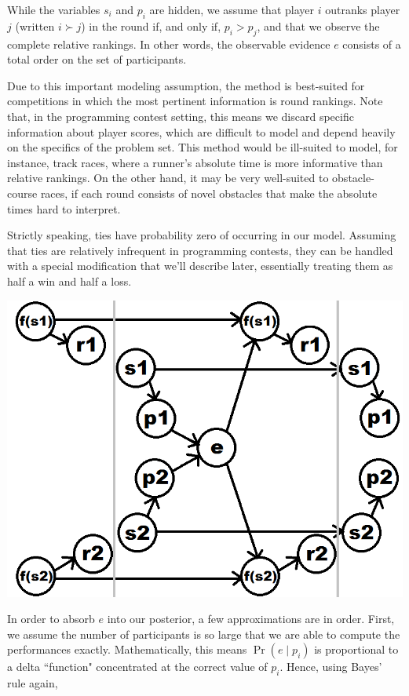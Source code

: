 While the variables $s_i$ and $p_i$ are hidden, we assume that player $i$ outranks player $j$ (written $i \succ j$) in the round if, and only if, $p_i > p_j$, and that we observe the complete relative rankings. In other words, the observable evidence $e$ consists of a total order on the set of participants.

Due to this important modeling assumption, the method is best-suited for competitions in which the most pertinent information is round rankings. Note that, in the programming contest setting, this means we discard specific information about player scores, which are difficult to model and depend heavily on the specifics of the problem set. This method would be ill-suited to model, for instance, track races, where a runner's absolute time is more informative than relative rankings. On the other hand, it may be very well-suited to obstacle-course races, if each round consists of novel obstacles that make the absolute times hard to interpret.

Strictly speaking, ties have probability zero of occurring in our model. Assuming that ties are relatively infrequent in programming contests, they can be handled with a special modification that we'll describe later, essentially treating them as half a win and half a loss.

\begin{center} \includegraphics[scale=0.35]{../images/HMMlabeled.png} \end{center}

In order to absorb $e$ into our posterior, a few approximations are in order. First, we assume the number of participants is so large that we are able to compute the performances exactly. Mathematically, this means $\Pr(e \mid p_i)$ is proportional to a delta ``function" concentrated at the correct value of $p_i$. Hence, using Bayes' rule again,

